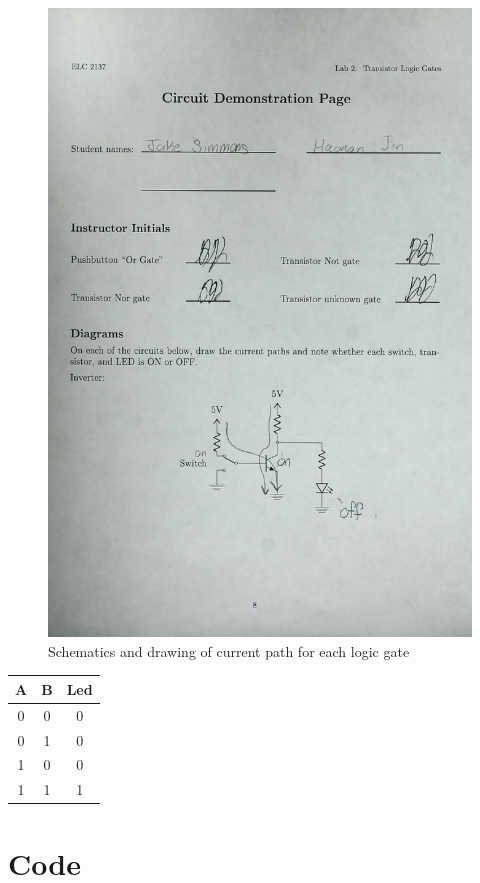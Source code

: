 \documentclass[11pt]{article}
\begin{document}
\begin{center}
\begin{figure}
		\includegraphics[width=1\textwidth,page=2]{Lab_2_Scan.pdf}
			\caption{Schematics and drawing of current path for each logic gate}
\end{figure}
\end{center}

\begin{center}
 	\caption{Table 1: Truth Table of the Final gate.}
	
	\begin{tabular}{cc|c} 
		\toprule
	 A & B & Led \\
	\midrule
	0 & 0 & 0  \\
	0 & 1 & 0 \\
	1 & 0 & 0  \\
	1 & 1 & 1  \\
	\bottomrule
	

	\end{tabular}\medskip
\end{center}


\clearpage
\section*{Code}
\end{document}
